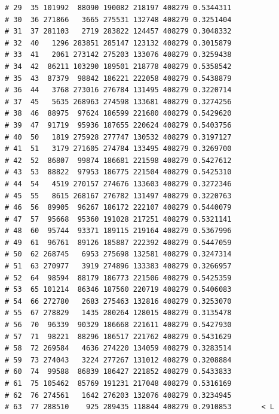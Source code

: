 \documentclass{article}\usepackage[]{graphicx}\usepackage[]{color}
\makeatletter
\newenvironment{kframe}{%
 \def\at@end@of@kframe{}%
 \ifinner\ifhmode%
  \def\at@end@of@kframe{\end{minipage}}%
  \begin{minipage}{\columnwidth}%
 \fi\fi%
 \def\FrameCommand##1{\hskip\@totalleftmargin \hskip-\fboxsep
 \colorbox{shadecolor}{##1}\hskip-\fboxsep
     \hskip-\linewidth \hskip-\@totalleftmargin \hskip\columnwidth}%
 \MakeFramed {\advance\hsize-\width
   \@totalleftmargin\z@ \linewidth\hsize
   \@setminipage}}%
 {\par\unskip\endMakeFramed%
 \at@end@of@kframe}
\newenvironment{knitrout}{}{} %
\makeatother
\begin{document}
\begin{knitrout}
\begin{kframe}
\begin{verbatim}
# 29  35 101992  88090 190082 218197 408279 0.5344311          
# 30  36 271866   3665 275531 132748 408279 0.3251404          
# 31  37 281103   2719 283822 124457 408279 0.3048332          
# 32  40   1296 283851 285147 123132 408279 0.3015879          
# 33  41   2061 273142 275203 133076 408279 0.3259438          
# 34  42  86211 103290 189501 218778 408279 0.5358542          
# 35  43  87379  98842 186221 222058 408279 0.5438879          
# 36  44   3768 273016 276784 131495 408279 0.3220714          
# 37  45   5635 268963 274598 133681 408279 0.3274256          
# 38  46  88975  97624 186599 221680 408279 0.5429620          
# 39  47  91719  95936 187655 220624 408279 0.5403756          
# 40  50   1819 275928 277747 130532 408279 0.3197127          
# 41  51   3179 271605 274784 133495 408279 0.3269700          
# 42  52  86807  99874 186681 221598 408279 0.5427612          
# 43  53  88822  97953 186775 221504 408279 0.5425310          
# 44  54   4519 270157 274676 133603 408279 0.3272346          
# 45  55   8615 268167 276782 131497 408279 0.3220763          
# 46  56  89905  96267 186172 222107 408279 0.5440079          
# 47  57  95668  95360 191028 217251 408279 0.5321141          
# 48  60  95744  93371 189115 219164 408279 0.5367996          
# 49  61  96761  89126 185887 222392 408279 0.5447059          
# 50  62 268745   6953 275698 132581 408279 0.3247314          
# 51  63 270977   3919 274896 133383 408279 0.3266957          
# 52  64  98594  88179 186773 221506 408279 0.5425359          
# 53  65 101214  86346 187560 220719 408279 0.5406083          
# 54  66 272780   2683 275463 132816 408279 0.3253070          
# 55  67 278829   1435 280264 128015 408279 0.3135478          
# 56  70  96339  90329 186668 221611 408279 0.5427930          
# 57  71  98221  88296 186517 221762 408279 0.5431629          
# 58  72 269584   4636 274220 134059 408279 0.3283514          
# 59  73 274043   3224 277267 131012 408279 0.3208884          
# 60  74  99588  86839 186427 221852 408279 0.5433833          
# 61  75 105462  85769 191231 217048 408279 0.5316169          
# 62  76 274561   1642 276203 132076 408279 0.3234945          
# 63  77 288510    925 289435 118844 408279 0.2910853       < L
\end{verbatim}
\end{kframe}
\end{knitrout}
\end{document}
